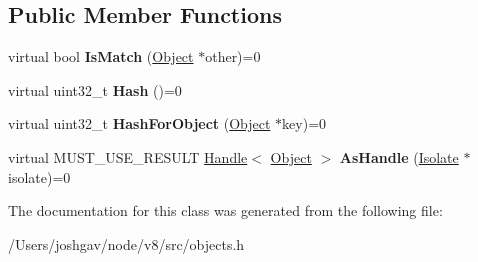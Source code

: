 \subsection*{Public Member Functions}
\begin{DoxyCompactItemize}
\item 
virtual bool {\bfseries Is\+Match} (\hyperlink{classv8_1_1internal_1_1_object}{Object} $\ast$other)=0\hypertarget{classv8_1_1internal_1_1_hash_table_key_a2ab80629572d6a06beea7d0f74cb5b20}{}\label{classv8_1_1internal_1_1_hash_table_key_a2ab80629572d6a06beea7d0f74cb5b20}

\item 
virtual uint32\+\_\+t {\bfseries Hash} ()=0\hypertarget{classv8_1_1internal_1_1_hash_table_key_a28f8ad09c53eac2bd5888d48f376a949}{}\label{classv8_1_1internal_1_1_hash_table_key_a28f8ad09c53eac2bd5888d48f376a949}

\item 
virtual uint32\+\_\+t {\bfseries Hash\+For\+Object} (\hyperlink{classv8_1_1internal_1_1_object}{Object} $\ast$key)=0\hypertarget{classv8_1_1internal_1_1_hash_table_key_ac2bd1e6c42749dcf182f9e9cf29b2ee2}{}\label{classv8_1_1internal_1_1_hash_table_key_ac2bd1e6c42749dcf182f9e9cf29b2ee2}

\item 
virtual M\+U\+S\+T\+\_\+\+U\+S\+E\+\_\+\+R\+E\+S\+U\+LT \hyperlink{classv8_1_1internal_1_1_handle}{Handle}$<$ \hyperlink{classv8_1_1internal_1_1_object}{Object} $>$ {\bfseries As\+Handle} (\hyperlink{classv8_1_1internal_1_1_isolate}{Isolate} $\ast$isolate)=0\hypertarget{classv8_1_1internal_1_1_hash_table_key_aaac5f148b44febab48f06c302dc251a7}{}\label{classv8_1_1internal_1_1_hash_table_key_aaac5f148b44febab48f06c302dc251a7}

\end{DoxyCompactItemize}


The documentation for this class was generated from the following file\+:\begin{DoxyCompactItemize}
\item 
/\+Users/joshgav/node/v8/src/objects.\+h\end{DoxyCompactItemize}
